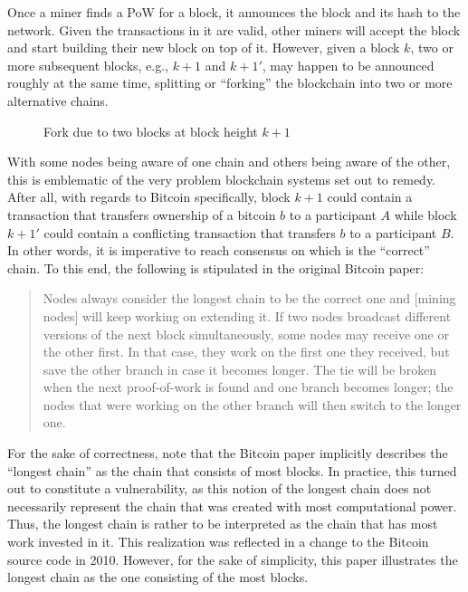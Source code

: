 Once a miner finds a PoW for a block, it announces the block and its hash to the network.
Given the transactions in it are valid, other miners will accept the block and start building their new block on top of it.
However, given a block \(k\), two or more subsequent blocks, e.g., \(k + 1\) and \(k + 1'\), may happen to be announced roughly at the same time, splitting or ``forking'' \autocite{bitcoinwiki2015fork} the blockchain into two or more alternative chains.
\\
\begin{figure}[H]
\centering

\caption*{Fork due to two blocks at block height \(k + 1\)}
\end{figure}

With some nodes being aware of one chain and others being aware of the other, this is emblematic of the very problem blockchain systems set out to remedy.
After all, with regards to Bitcoin specifically, block \(k + 1\) could contain a transaction that transfers ownership of a bitcoin \(b\) to a participant \(A\) while block \(k + 1'\) could contain a conflicting transaction that transfers \(b\) to a participant \(B\).
In other words, it is imperative to reach consensus on which is the ``correct'' chain.
To this end, the following is stipulated in the original Bitcoin paper: \autocite[3]{nakamoto2008}

\begin{quote}
  Nodes always consider the longest chain to be the correct one and [mining nodes] will keep working on extending it.
  If two nodes broadcast different versions of the next block simultaneously, some nodes may receive one or the other first.
  In that case, they work on the first one they received, but save the other branch in case it becomes longer.
  The tie will be broken when the next proof-of-work is found and one branch becomes longer; the nodes that were working on the other branch will then switch to the longer one.
\end{quote}

For the sake of correctness, note that the Bitcoin paper implicitly describes the ``longest chain'' as the chain that consists of most blocks.
In practice, this turned out to constitute a vulnerability, as this notion of the longest chain does not necessarily represent the chain that was created with most computational power.
Thus, the longest chain is rather to be interpreted as the chain that has most work invested in it.
This realization was reflected in a change to the Bitcoin source code in 2010. \autocite{github2010workvsheight}
However, for the sake of simplicity, this paper illustrates the longest chain as the one consisting of the most blocks.

